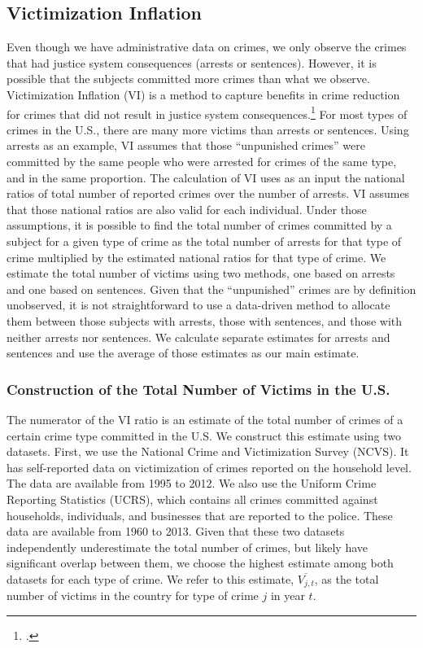 \subsection{Victimization Inflation}
\noindent Even though we have administrative data on crimes, we only observe the crimes that had justice system consequences (arrests or sentences). However, it is possible that the subjects committed more crimes than what we observe. Victimization Inflation (VI) is a method to capture benefits in crime reduction for crimes that did not result in justice system consequences.\footnote{\citet{Belfield_Nores_etal_2006_JHR,Heckman_Moon_etal_2010_RateofReturn}.} For most types of crimes in the U.S., there are many more victims than arrests or sentences. Using arrests as an example, VI assumes that those ``unpunished crimes'' were committed by the same people who were arrested for crimes of the same type, and in the same proportion. The calculation of VI uses as an input the national ratios of total number of reported crimes over the number of arrests. VI assumes that those national ratios are also valid for each individual. Under those assumptions, it is possible to find the total number of crimes committed by a subject for a given type of crime as the total number of arrests for that type of crime multiplied by the estimated national ratios for that type of crime. We estimate the total number of victims using two methods, one based on arrests and one based on sentences. Given that the ``unpunished'' crimes are by definition unobserved, it is not straightforward to use a data-driven method to allocate them between those subjects with arrests, those with sentences, and those with neither arrests nor sentences. We calculate separate estimates for arrests and sentences and use the average of those estimates as our main estimate. \\

\subsubsection{Construction of the Total Number of Victims in the U.S.}

\noindent The numerator of the VI ratio is an estimate of the total number of crimes of a certain crime type committed in the U.S. We construct this estimate using two datasets. First, we use the National Crime and Victimization Survey (NCVS). It has self-reported data on victimization of crimes reported on the household level. The data are available from 1995 to 2012. We also use the Uniform Crime Reporting Statistics (UCRS), which contains all crimes committed against households, individuals, and businesses that are reported to the police. These data are available from 1960 to 2013. Given that these two datasets independently underestimate the total number of crimes, but likely have significant overlap between them, we choose the highest estimate among both datasets for each type of crime. We refer to this estimate, $\overline{V_{j,t}}$, as the total number of victims in the country for type of crime $j$ in year $t$. \\


